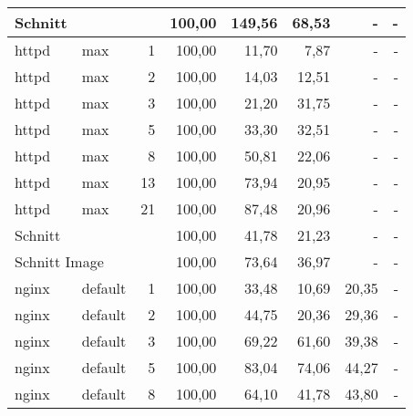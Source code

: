 \begin{footnotesize}
\begin{longtable}{llrrrrrr}
		Schnitt        &         &            & 100,00 & 149,56                      & 68,53                          & -      & -      \\ \hline
		httpd          & max     & 1          & 100,00 & 11,70                       & 7,87                           & -      & -      \\
		httpd          & max     & 2          & 100,00 & 14,03                       & 12,51                          & -      & -      \\
		httpd          & max     & 3          & 100,00 & 21,20                       & 31,75                          & -      & -      \\
		httpd          & max     & 5          & 100,00 & 33,30                       & 32,51                          & -      & -      \\
		httpd          & max     & 8          & 100,00 & 50,81                       & 22,06                          & -      & -      \\
		httpd          & max     & 13         & 100,00 & 73,94                       & 20,95                          & -      & -      \\
		httpd          & max     & 21         & 100,00 & 87,48                       & 20,96                          & -      & -      \\ \hline
		Schnitt        &         &            & 100,00 & 41,78                       & 21,23                          & -      & -      \\ \hline
		\multicolumn{2}{l}{Schnitt Image} &            & 100,00 & 73,64                       & 36,97                          & -      & -      \\ \hline
		nginx          & default & 1          & 100,00 & 33,48                       & 10,69                          & 20,35  & -      \\
		nginx          & default & 2          & 100,00 & 44,75                       & 20,36                          & 29,36  & -      \\
		nginx          & default & 3          & 100,00 & 69,22                       & 61,60                          & 39,38  & -      \\
		nginx          & default & 5          & 100,00 & 83,04                       & 74,06                          & 44,27  & -      \\
		nginx          & default & 8          & 100,00 & 64,10                       & 41,78                          & 43,80  & -      \\

\end{longtable}
\end{footnotesize}
